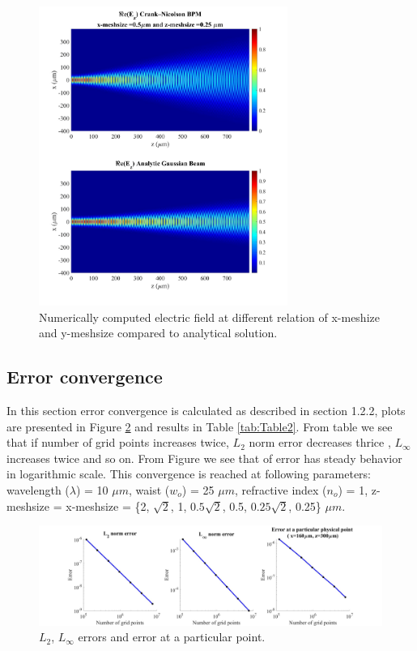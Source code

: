 \documentclass[a4paper]{article}
\begin{document}
	\begin{figure}[H]
		\hspace{-24.5mm}
		\includegraphics[width=0.725\textwidth]{change5.jpg}	
		\caption{\label{fig:Relation} Numerically computed electric field at different relation of x-meshize and y-meshsize compared to analytical solution.}
	\end{figure}
	
	\subsection{Error convergence}
	In this section error convergence is calculated as described in section 1.2.2, plots are presented in Figure \ref{fig:Error} and results in Table \ref{tab:Table2}. From table we see that if number of grid points increases twice, $L_{2}$ norm error decreases thrice , $L_{\infty}$ increases twice and so on. From Figure we see that of error has steady behavior in logarithmic scale. This convergence is reached at following parameters: wavelength ($\lambda$) = 10 $\mu m$, waist ($w_o$) = 25 $\mu m$, refractive index ($n_o$) = 1, z-meshsize = x-meshsize  = \{2, $\sqrt{2}$, 1, $0.5\sqrt{2}$, 0.5, $0.25\sqrt{2}$, 0.25\} $\mu m$.
	\begin{figure}[H]
		\hspace{-30mm}
		\includegraphics[width=1.5\textwidth]{error.jpg}
		\caption{\label{fig:Error} $L_{2}$, $L_{\infty}$ errors and error at a particular point.}
	\end{figure}
	
\end{document}
